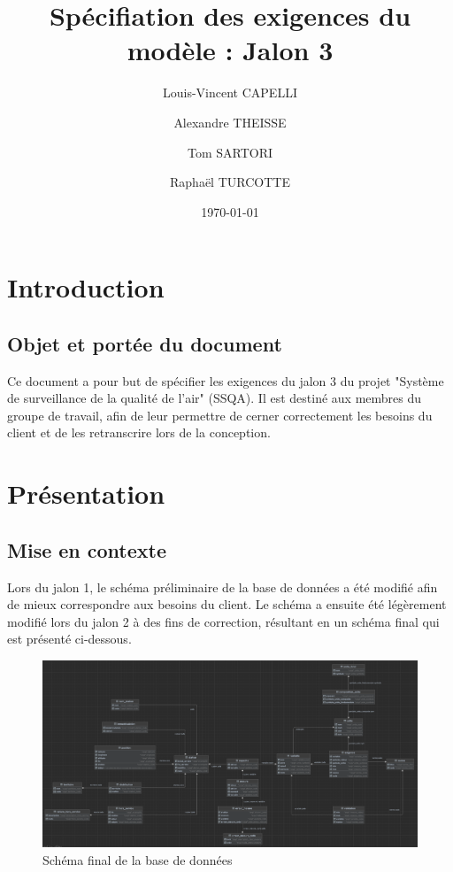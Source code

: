 \documentclass{article}
\begin{document}
\title{Spécifiation des exigences du modèle : Jalon 3}

\author{Louis-Vincent CAPELLI \and Alexandre THEISSE \and Tom SARTORI \and Raphaël TURCOTTE}
\date{\today}
\maketitle
\newpage

\tableofcontents
\newpage

\section{Introduction}
\subsection*{Objet et portée du document}
Ce document a pour but de spécifier les exigences du jalon 3 du projet "Système
de surveillance de la qualité de l'air" (SSQA). Il est destiné aux membres du 
groupe de travail, afin de leur permettre de cerner correctement les besoins
du client et de les retranscrire lors de la conception.

\section{Présentation}
\subsection{Mise en contexte}
Lors du jalon 1, le schéma préliminaire de la base de données a été
modifié afin de mieux correspondre aux besoins du client. Le schéma a ensuite
été légèrement modifié lors du jalon 2 à des fins de correction, résultant
en un schéma final qui est présenté ci-dessous.

\begin{figure}[h]
    \centering
    \includegraphics[width=1\textwidth]{db_modif.png}
    \caption{Schéma final de la base de données}
\end{figure}
\end{document}
